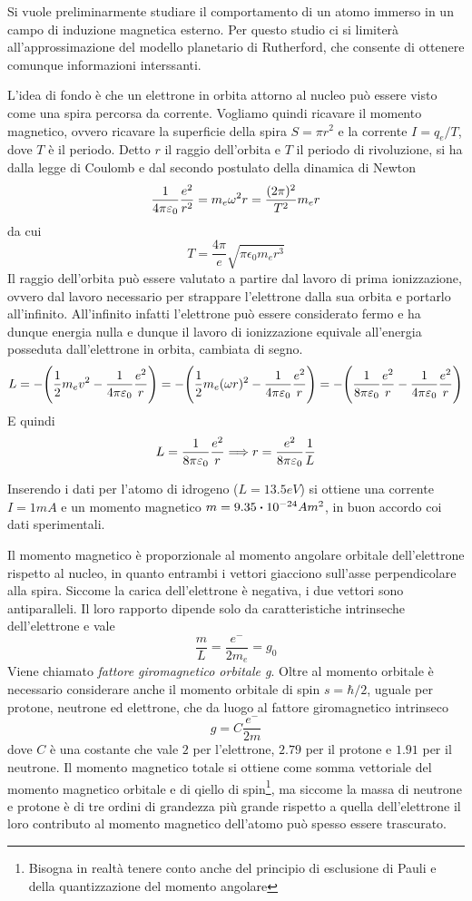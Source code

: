 Si vuole preliminarmente studiare il comportamento di un atomo immerso in un campo di induzione
magnetica esterno. Per questo studio ci si limiterà all'approssimazione del modello planetario
di Rutherford, che consente di ottenere comunque informazioni interssanti.

L'idea di fondo è che un elettrone in orbita attorno al nucleo può essere visto come una spira
percorsa da corrente. Vogliamo quindi ricavare il momento magnetico, ovvero ricavare la superficie della spira
$S=\pi r^2$ e la corrente $I=q_e/T$, dove $T$ è il periodo.
Detto $r$ il raggio dell'orbita e $T$ il periodo di rivoluzione, si ha dalla legge di Coulomb
e dal secondo postulato della dinamica di Newton
\[
\frac{1}{4\pi\varepsilon_0}\frac{e^2}{r^2}=m_e\omega^2 r=\frac{(2\pi)^2}{T^2}m_e r
\]
da cui
\[
T=\frac{4\pi}{e}\sqrt{\pi\epsilon_0 m_e r^3}
\]
Il raggio dell'orbita può essere valutato a partire dal lavoro di prima ionizzazione,
ovvero dal lavoro necessario per strappare l'elettrone dalla sua orbita e portarlo
all'infinito. All'infinito infatti l'elettrone può essere considerato fermo e ha
dunque energia nulla e dunque il lavoro di ionizzazione equivale all'energia posseduta
dall'elettrone in orbita, cambiata di segno.
\[
L=-\Biggl(\frac{1}{2}m_e v^2 - \frac{1}{4\pi\varepsilon_0}\frac{e^2}{r} \Biggr)=-\Biggl(\frac{1}{2}m_e (\omega r)^2 - \frac{1}{4\pi\varepsilon_0}\frac{e^2}{r} \Biggr)=
-\Biggl(\frac{1}{8\pi\varepsilon_0} \frac{e^2}{r} - \frac{1}{4\pi\varepsilon_0}\frac{e^2}{r} \Biggr)
\]
E quindi
\[
L=\frac{1}{8\pi\varepsilon_0} \frac{e^2}{r} \Longrightarrow  r=\frac{e^2}{8\pi\varepsilon_0}\frac{1}{L}
\]

Inserendo i dati per l'atomo di idrogeno ($L=13.5 eV$) si ottiene una corrente $I=1mA$ e
un momento magnetico $m=9.35\vdot 10^{-24} Am^2$, in buon accordo coi dati sperimentali.

Il momento magnetico è proporzionale al momento angolare orbitale dell'elettrone rispetto al
nucleo, in quanto entrambi i vettori giacciono sull'asse perpendicolare alla spira. Siccome la carica dell'elettrone
è negativa, i due vettori sono antiparalleli. Il loro rapporto dipende solo da caratteristiche
intrinseche dell'elettrone e vale
\[
\frac{m}{L}=\frac{e^-}{2m_e}=g_0
\]
Viene chiamato \textit{fattore giromagnetico orbitale g}.
Oltre al momento orbitale è necessario considerare anche il momento orbitale di spin
$s=\hbar/2$, uguale per protone, neutrone ed elettrone, che da luogo al fattore giromagnetico
intrinseco
\[
g=C\frac{e^-}{2m}
\]
dove $C$ è una costante che vale $2$ per l'elettrone, $2.79$ per il protone e $1.91$ per il neutrone.
Il momento magnetico totale si ottiene come somma vettoriale del momento magnetico orbitale e di qiello di
spin\footnote{Bisogna in realtà tenere conto anche del principio di esclusione di Pauli e della quantizzazione
del momento angolare}, ma siccome la massa di neutrone e protone è di tre ordini di grandezza più grande rispetto a quella dell'elettrone
il loro contributo al momento magnetico dell'atomo può spesso essere trascurato.


